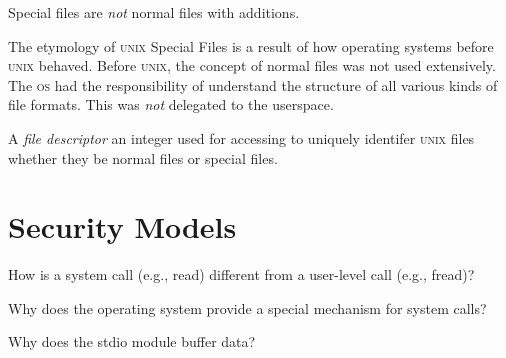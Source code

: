 Special files are \textit{not} normal files with additions.

The etymology of \textsc{unix} Special Files is a result of how 
operating systems before \textsc{unix} behaved. Before \textsc{unix}, 
the concept of normal files was not used extensively. 
The \textsc{os} had the responsibility of understand the structure 
of all various kinds of file formats. This was \textit{not} delegated 
to the userspace. 

\frmrule

A \textit{file descriptor} an integer used for accessing to uniquely 
identifer \textsc{unix} files whether they be normal files or special files.


\section{Security Models}

\begin{example}
How is a system call (e.g., read) different from a user-level call (e.g., fread)?
\end{example}

\begin{example}
Why does the operating system provide a special mechanism for system calls?
\end{example}

\begin{example}
Why does the stdio module buffer data? 
\end{example}


